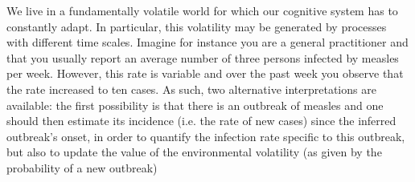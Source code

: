 \documentclass[12pt,english]{article}%
\newcommand{\AM}[1]{\textbf{\textcolor{blue}{[AM: #1]}}}
\begin{document}
We live in a fundamentally volatile world for which
our cognitive system has to constantly adapt.
In particular, this volatility may be generated
by processes with different time scales.
Imagine for instance you are a general practitioner and
that you usually report an average number of
three persons infected by measles per week.
However, this rate is variable and
over the past week you observe that the rate increased to ten cases.
As such, two alternative interpretations are available:
the first possibility is that there is an outbreak of measles and
one should then estimate its incidence
(i.e. the rate of new cases)
since the inferred outbreak's onset, in order
to quantify the infection rate specific to this outbreak,
but also to update the value of the environmental volatility (as given by the probability of a new outbreak)
\end{document}
